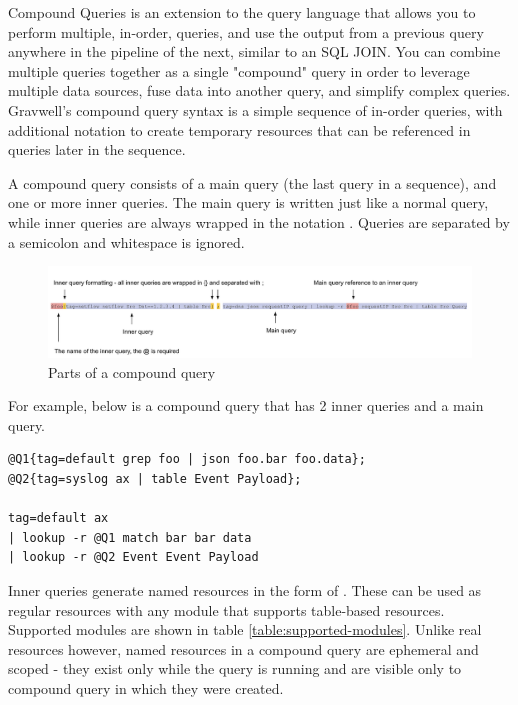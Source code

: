 Compound Queries is an extension to the query language that allows you to
perform multiple, in-order, queries, and use the output from a previous query
anywhere in the pipeline of the next, similar to an SQL JOIN. You can combine
multiple queries together as a single "compound" query in order to leverage
multiple data sources, fuse data into another query, and simplify complex
queries. Gravwell's compound query syntax is a simple sequence of in-order
queries, with additional notation to create temporary resources that can be
referenced in queries later in the sequence.

A compound query consists of a main query (the last query in a sequence), and
one or more inner queries. The main query is written just like a normal query,
while inner queries are always wrapped in the notation
.  Queries are separated by a semicolon and
whitespace is ignored.

\begin{figure}[H]
	\includegraphics[width=0.9\linewidth]{images/compound-breakdown.png}
	\caption{Parts of a compound query}
	\label{fig:compound-breakdown}
\end{figure}

For example, below is a compound query that has 2 inner queries and a main
query. 

\begin{verbatim}
@Q1{tag=default grep foo | json foo.bar foo.data};
@Q2{tag=syslog ax | table Event Payload};

tag=default ax 
| lookup -r @Q1 match bar bar data 
| lookup -r @Q2 Event Event Payload
\end{verbatim}

Inner queries generate named resources in the form of .
These can be used as regular resources with any module that supports
table-based resources. Supported modules are shown in table
\ref{table:supported-modules}. Unlike real resources however, named resources
in a compound query are ephemeral and scoped - they exist only while the query
is running and are visible only to compound query in which they were created.

